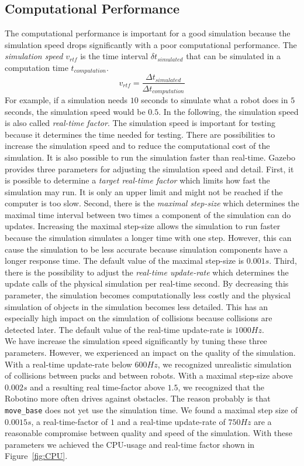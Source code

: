 \subsection{Computational Performance}
The computational performance is important for a good simulation because the simulation speed drops significantly with a poor computational performance. The \textit{simulation speed} $v_{rtf}$ is the time interval $\delta t_{simulated}$ that can be simulated in a computation time $t_{computation}$.
$$
v_{rtf} = \frac{\Delta t_{simulated}}{\Delta t_{computation}}
$$
For example, if a simulation needs $10$ seconds to simulate what a robot does in $5$ seconds, the simulation speed would be $0.5$. In the following, the simulation speed is also called \textit{real-time factor}. The simulation speed is important for testing because it determines the time needed for testing. There are possibilities to increase the simulation speed and to reduce the computational cost of the simulation. It is also possible to run the simulation faster than real-time. Gazebo provides three parameters for adjusting the simulation speed and detail. First, it is possible to determine a \textit{target real-time factor} which limits how fast the simulation may run. It is only an upper limit and might not be reached if the computer is too slow. Second, there is the \textit{maximal step-size} which determines the maximal time interval between two times a component of the simulation can do updates. Increasing the maximal step-size allows the simulation to run faster because the simulation simulates a longer time with one step. However, this can cause the simulation to be less accurate because simulation components have a longer response time. The default value of the maximal step-size is $0.001s$. Third, there is the possibility to adjust the \textit{real-time update-rate} which determines the update calls of the  physical simulation per real-time second. By decreasing this parameter, the simulation becomes computationally less costly and the physical simulation of objects in the simulation becomes less detailed. This has an especially high impact on the simulation of collisions because collisions are detected later. The default value of the real-time update-rate is $1000 Hz$.\\
We have increase the simulation speed significantly by tuning these three parameters. However, we experienced an impact on the quality of the simulation. With a real-time update-rate below $600Hz$, we recognized unrealistic simulation of collisions between pucks and between robots. With a maximal step-size above $0.002s$ and a resulting real time-factor above $1.5$, we recognized that the Robotino more often drives against obstacles. The reason probably is that \texttt{move\_base} does not yet use the simulation time. We found a maximal step size of $0.0015s$, a real-time-factor of $1$ and a real-time update-rate of $750Hz$ are a reasonable compromise between quality and speed of the simulation. With these parameters we achieved the CPU-usage and real-time factor shown in Figure~\ref{fig:CPU}.

